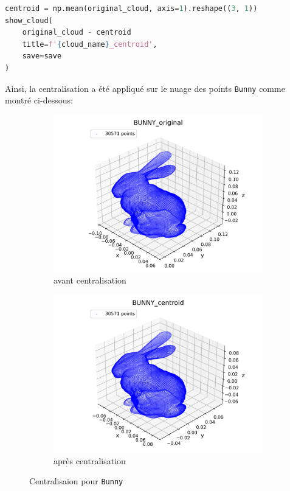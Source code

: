 \documentclass[../5RO17_TP4.tex]{subfiles}
\begin{document}
\begin{scriptsize}\mycode
	\begin{lstlisting}[language=Python, caption=\texttt{centroid()}]
centroid = np.mean(original_cloud, axis=1).reshape((3, 1))
show_cloud(
    original_cloud - centroid
    title=f'{cloud_name}_centroid',
    save=save
)
	\end{lstlisting}
\end{scriptsize}
\noindent Ainsi, la centralisation a été appliqué sur le nuage des points \texttt{Bunny} comme montré ci-dessous:
\begin{figure}[H]
    \centering
    \begin{subfigure}[b]{0.475\textwidth}
        \centering
        \includegraphics[width=\linewidth]{images/BUNNY_original.png}
        \caption{avant centralisation}
        \label{}
    \end{subfigure}\hfill
    \begin{subfigure}[b]{0.475\textwidth}
        \centering
        \includegraphics[width=\linewidth]{images/BUNNY_centroid.png}
        \caption{après centralisation}
        \label{}
    \end{subfigure}
    \caption{Centralisaion pour \texttt{Bunny}}
    \label{}
\end{figure}
\end{document}
